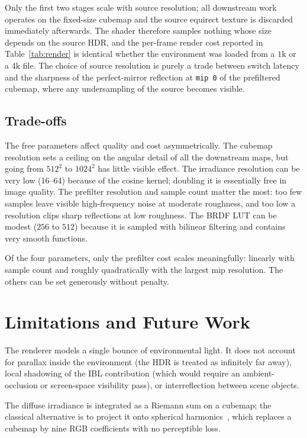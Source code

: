 \documentclass{egpubl}
\begin{document}
Only the first two stages scale with source resolution; all downstream work
operates on the fixed-size cubemap and the source equirect texture is
discarded immediately afterwards. The shader therefore samples nothing whose
size depends on the source HDR, and the per-frame render cost reported in
Table~\ref{tab:render} is identical whether the environment was loaded from a
$1\text{k}$ or a $4\text{k}$ file. The choice of source resolution is purely a
trade between switch latency and the sharpness of the perfect-mirror
reflection at \texttt{mip~0} of the prefiltered cubemap, where any
undersampling of the source becomes visible.

\subsection{Trade-offs}

The free parameters affect quality and cost asymmetrically. The cubemap
resolution sets a ceiling on the angular detail of all the downstream
maps, but going from $512^2$ to $1024^2$ has little visible effect. The
irradiance resolution can be very low (16--64) because of the cosine
kernel; doubling it is essentially free in image quality. The prefilter
resolution and sample count matter the most: too few samples leave
visible high-frequency noise at moderate roughness, and too low a
resolution clips sharp reflections at low roughness. The BRDF LUT can be
modest ($256$ to $512$) because it is sampled with bilinear filtering and
contains very smooth functions.

Of the four parameters, only the prefilter cost scales meaningfully:
linearly with sample count and roughly quadratically with the largest mip
resolution. The others can be set generously without penalty.

\section{Limitations and Future Work}

The renderer models a single bounce of environmental light. It does not
account for parallax inside the environment (the HDR is treated as
infinitely far away), local shadowing of the IBL contribution (which
would require an ambient-occlusion or screen-space visibility pass), or
interreflection between scene objects.

The diffuse irradiance is integrated as a Riemann sum on a cubemap; the
classical alternative is to project it onto spherical
harmonics~\cite{Ramamoorthi2001}, which replaces a cubemap by nine RGB
coefficients with no perceptible loss.
\end{document}

